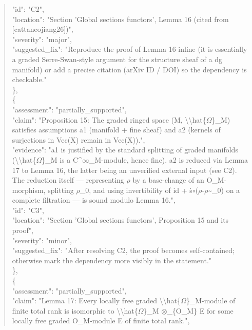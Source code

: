 \documentclass[11pt]{article}
\begin{document}
\begin{quote}
      "id": "C2",\\
      "location": "Section 'Global sections functors', Lemma 16 (cited from [cattaneojiang26])",\\
      "severity": "major",\\
      "suggested\_fix": "Reproduce the proof of Lemma 16 inline (it is essentially a graded Serre-Swan-style argument for the structure sheaf of a dg manifold) or add a precise citation (arXiv ID / DOI) so the dependency is checkable."\\
    \},\\
    \{\\
      "assessment": "partially\_supported",\\
      "claim": "Proposition 15: The graded ringed space (M, \textbackslash{}\textbackslash{}hat\{\ensuremath{\Omega}\}\_M) satisfies assumptions a1 (manifold + fine sheaf) and a2 (kernels of surjections in Vec(X) remain in Vec(X)).",\\
      "evidence": "a1 is justified by the standard splitting of graded manifolds (\textbackslash{}\textbackslash{}hat\{\ensuremath{\Omega}\}\_M is a C\^{}\ensuremath{\infty}\_M-module, hence fine). a2 is reduced via Lemma 17 to Lemma 16, the latter being an unverified external input (see C2). The reduction itself --- representing \ensuremath{\rho} by a base-change of an O\_M-morphism, splitting \ensuremath{\rho}\_0, and using invertibility of id + ṡ\ensuremath{\circ}(\ensuremath{\rho}-\ensuremath{\rho}\~{}\_0) on a complete filtration --- is sound modulo Lemma 16.",\\
      "id": "C3",\\
      "location": "Section 'Global sections functors', Proposition 15 and its proof",\\
      "severity": "minor",\\
      "suggested\_fix": "After resolving C2, the proof becomes self-contained; otherwise mark the dependency more visibly in the statement."\\
    \},\\
    \{\\
      "assessment": "partially\_supported",\\
      "claim": "Lemma 17: Every locally free graded \textbackslash{}\textbackslash{}hat\{\ensuremath{\Omega}\}\_M-module of finite total rank is isomorphic to \textbackslash{}\textbackslash{}hat\{\ensuremath{\Omega}\}\_M \ensuremath{\otimes}\_\{O\_M\} E for some locally free graded O\_M-module E of finite total rank.",\\

\end{quote}
\end{document}
